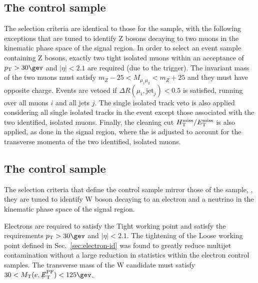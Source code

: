 \subsection{The \texorpdfstring{\mmj}{di-muon plus jets} control sample}
\label{subsec:mumucontrolSelection}


The selection criteria are identical to those for the \mj sample, with
the following exceptions that are tuned to identify Z bosons decaying
to two muons in the kinematic phase space of the signal region. 
In order to select an event sample containing Z bosons, exactly two
tight isolated muons within an acceptance of $\Pt > 30\gev$ and
$|\eta| < 2.1$ are required (due to the trigger). The invariant mass
of the two muons must satisfy $m_{Z} - 25 < M_{\mu_1\mu_2} < m_{Z} +
25$ and they must have opposite charge. Events are vetoed if $\Delta
R(\mu_{i},\textrm{jet}_j) < 0.5$ is satisfied, running over all muons
$i$ and all jets $j$. The single isolated track veto is also applied
considering all single isolated tracks in the event except those
associated with the two identified, isolated muons. Finally, the
cleaning cut $\mbox{$H_{\rm T}^{\rm miss}$}/\mbox{$E_\text{T}^{\rm miss}$}$ is also applied, as done in the signal
region, where the \met is adjusted to account for the transverse
momenta of the two identified, isolated muons. 

\subsection{The \texorpdfstring{\ej}{electron plus jets} control sample}
\label{subsec:elecontrolSelection}

The selection criteria that define the \ej control sample
mirror those of the \mj sample, \ie, they are tuned
to identify W boson decaying to an electron and a neutrino in the
kinematic phase space of the signal region.

Electrons are required to satisfy the Tight working point and satisfy
the requirements $\Pt> 30\gev$ and $|\eta| < 2.1$. The tightening of
the Loose working point defined in Sec.~\ref{sec:electron-id} was
found to greatly reduce multijet contamination without a large
reduction in statistics within the electron control samples. The
transverse mass of the W candidate must satisfy $30 < \mt(e,\pfmet)
< 125\gev$.

